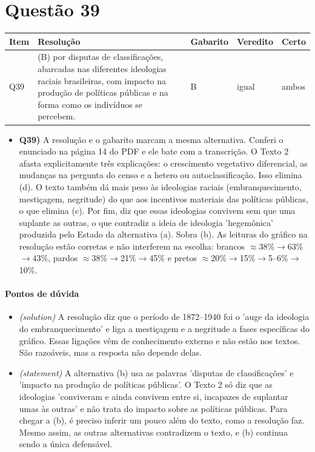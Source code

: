 \documentclass{article}%
\begin{document}
\section*{Questão 39}%
\begin{longtable}{@{}p{} p{} p{} p{} p{}@{}}\toprule Item & Resolução & Gabarito & Veredito & Certo \\ \midrule
Q39 & (B) por disputas de classificações, abarcadas nas diferentes ideologias raciais brasileiras, com impacto na produção de políticas públicas e na forma como os indivíduos se percebem. & B & igual & ambos \\
\bottomrule\end{longtable}%
\begin{itemize}%
\item%
\textbf{Q39)} A resolução e o gabarito marcam a mesma alternativa. Conferi o enunciado na página 14 do PDF e ele bate com a transcrição. O Texto 2 afasta explicitamente três explicações: o crescimento vegetativo diferencial, as mudanças na pergunta do censo e a hetero ou autoclassificação. Isso elimina (d). O texto também dá mais peso às ideologias raciais (embranquecimento, mestiçagem, negritude) do que aos incentivos materiais das políticas públicas, o que elimina (c). Por fim, diz que essas ideologias convivem sem que uma suplante as outras, o que contradiz a ideia de ideologia 'hegemônica' produzida pelo Estado da alternativa (a). Sobra (b). As leituras do gráfico na resolução estão corretas e não interferem na escolha: brancos $\approx$38\%$\to$63\%$\to$43\%, pardos $\approx$38\%$\to$21\%$\to$45\% e pretos $\approx$20\%$\to$15\%$\to$5--6\%$\to$10\%.%
\end{itemize}%
\paragraph{Pontos de dúvida}%
\begin{itemize}%
\item%
\textit{(solution)} A resolução diz que o período de 1872--1940 foi o 'auge da ideologia do embranquecimento' e liga a mestiçagem e a negritude a fases específicas do gráfico. Essas ligações vêm de conhecimento externo e não estão nos textos. São razoáveis, mas a resposta não depende delas.%
\item%
\textit{(statement)} A alternativa (b) usa as palavras 'disputas de classificações' e 'impacto na produção de políticas públicas'. O Texto 2 só diz que as ideologias 'conviveram e ainda convivem entre si, incapazes de suplantar umas às outras' e não trata do impacto sobre as políticas públicas. Para chegar a (b), é preciso inferir um pouco além do texto, como a resolução faz. Mesmo assim, as outras alternativas contradizem o texto, e (b) continua sendo a única defensável.%
\end{itemize}%
\end{document}
